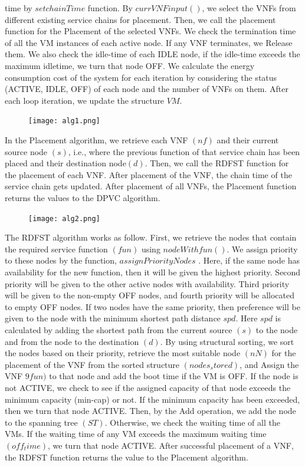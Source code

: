 \documentclass[12pt]{article}
\begin{document}
time by $setchainTime$ function. By $currVNFinput()$, we
select the VNFs from different existing service chains for
placement. Then, we call the placement function for the
Placement of the selected VNFs. We check the termination
time of all the VM instances of each active node. If any VNF
terminates, we Release them. We also check the idle-time of
each IDLE node, if the  idle-time exceeds the maximum idletime, we turn that node OFF. We calculate the energy
consumption cost of the system for each iteration by
considering the status (ACTIVE, IDLE, OFF) of each node
and the number of VNFs on them. After each loop iteration,
we update the structure $VM$.
\begin{figure}[!t] \label{fig:4}
  \texttt{[image: alg1.png]}
\end{figure}
In the Placement algorithm, we retrieve each VNF $(nf)$ and
their current source node $(s)$, i.e., where the previous function
of that service chain has been placed and their destination
node$(d)$. Then, we call the RDFST function for the placement
of each VNF. After placement of the VNF, the chain time of
the service chain gets updated. After placement of all VNFs,
the Placement function returns the values to the DPVC
algorithm.
\begin{figure}[!t] \label{fig:5}
  \texttt{[image: alg2.png]}
\end{figure}
The RDFST algorithm works as follow. First, we retrieve
the nodes that contain the required service function $(fun)$
using $nodeWithfun()$. We assign priority to these nodes by
the function, $assignPriorityNodes$ . Here, if the same
node has availability for the new function, then it will be given
the highest priority. Second priority will be given to the other
active nodes with availability. Third priority will be given to
the non-empty OFF nodes, and fourth priority will be
allocated to empty OFF nodes. If two nodes have the same
priority, then preference will be given to the node with the
minimum shortest path distance $spd$. Here $spd$ is calculated
by adding the shortest path from the current source $(s)$ to the
node and from the node to the destination $(d)$. By using
structural sorting, we sort the nodes based on their priority,
retrieve the most suitable node $(nN)$ for the placement of the
VNF from the sorted structure $(nodes_stored)$, and Assign the
VNF $9fun)$ to that node and add the boot time if the VM is
OFF. If the node is not ACTIVE, we check to see if the
assigned capacity of that node exceeds the minimum capacity
(min-cap) or not. If the minimum capacity has been exceeded,
then we turn that node ACTIVE. Then, by the Add operation,
we add the node to the spanning tree $(ST)$. Otherwise, we
check the waiting time of all the VMs. If the waiting time of
any VM exceeds the maximum waiting time $(off_time)$, we
turn that node ACTIVE. After successful placement of a VNF,
the RDFST function returns the value to the Placement
algorithm.
\end{document}
